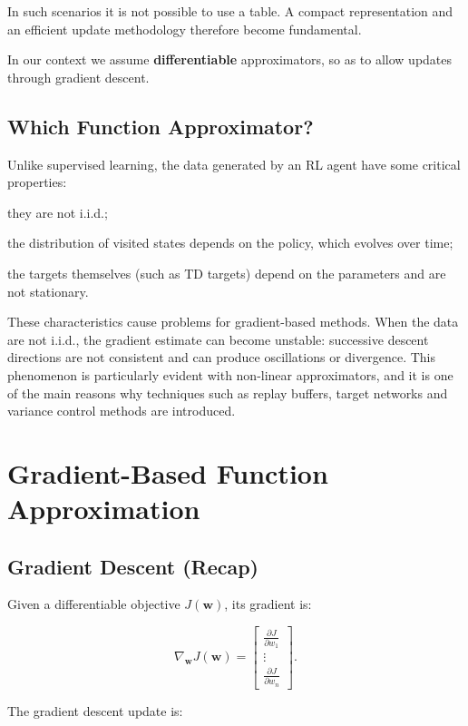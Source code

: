 In such scenarios it is not possible to use a table.
A compact representation and an efficient update methodology therefore become fundamental.

In our context we assume \textbf{differentiable} approximators, so as to allow updates through gradient descent.

\subsection{Which Function Approximator?}

Unlike supervised learning, the data generated by an RL agent have some critical properties:

\begin{compactitemize}
    \item they are not i.i.d.;
    \item the distribution of visited states depends on the policy, which evolves over time;
    \item the targets themselves (such as TD targets) depend on the parameters and are not stationary.
\end{compactitemize}

These characteristics cause problems for gradient-based methods.
When the data are not i.i.d., the gradient estimate can become unstable: successive descent directions are not consistent and can produce oscillations or divergence.
This phenomenon is particularly evident with non-linear approximators, and it is one of the main reasons why techniques such as replay buffers, target networks and variance control methods are introduced.
\section{Gradient-Based Function Approximation}
\subsection{Gradient Descent (Recap)}

Given a differentiable objective $J(\mathbf{w})$, its gradient is:

\[
\nabla_{\mathbf{w}} J(\mathbf{w})
=
\begin{bmatrix}
\frac{\partial J}{\partial w_1} \\
\vdots \\
\frac{\partial J}{\partial w_n}
\end{bmatrix}.
\]

The gradient descent update is:

